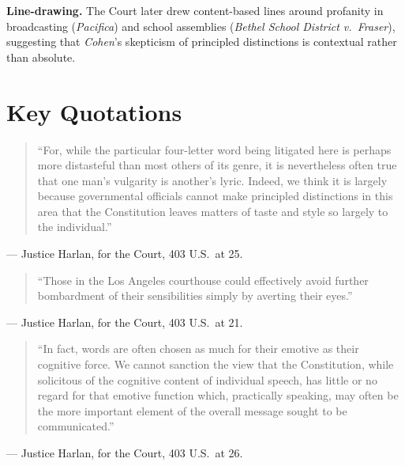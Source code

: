 \documentclass[12pt]{article}
\begin{document}
\textbf{Line-drawing.} The Court later drew content-based lines around profanity in broadcasting (\textit{Pacifica}) and school assemblies (\textit{Bethel School District v.\ Fraser}), suggesting that \textit{Cohen}'s skepticism of principled distinctions is contextual rather than absolute.

\section{Key Quotations}

\begin{quote}
``For, while the particular four-letter word being litigated here is perhaps more distasteful than most others of its genre, it is nevertheless often true that one man's vulgarity is another's lyric. Indeed, we think it is largely because governmental officials cannot make principled distinctions in this area that the Constitution leaves matters of taste and style so largely to the individual.''
\end{quote}
\noindent --- Justice Harlan, for the Court, 403 U.S.\ at 25.

\begin{quote}
``Those in the Los Angeles courthouse could effectively avoid further bombardment of their sensibilities simply by averting their eyes.''
\end{quote}
\noindent --- Justice Harlan, for the Court, 403 U.S.\ at 21.

\begin{quote}
``In fact, words are often chosen as much for their emotive as their cognitive force. We cannot sanction the view that the Constitution, while solicitous of the cognitive content of individual speech, has little or no regard for that emotive function which, practically speaking, may often be the more important element of the overall message sought to be communicated.''
\end{quote}
\noindent --- Justice Harlan, for the Court, 403 U.S.\ at 26.
\end{document}
